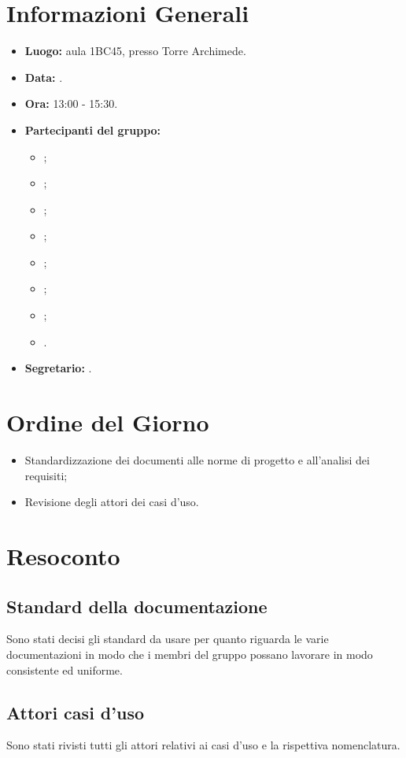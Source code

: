 \section{Informazioni Generali}
\begin{itemize}
\item \textbf{Luogo:} aula 1BC45, presso Torre Archimede.
\item \textbf{Data:} \Data.
\item \textbf{Ora:} 13:00 - 15:30.
\item \textbf{Partecipanti del gruppo:}
	\begin{itemize}
		\item \AT{}; 
		\item \BR{};
		\item \CE{}; 
		\item \DF{};
		\item \LD{};
		\item \MC{};
		\item \PF{};
		\item \SE{}.
	\end{itemize} 
\item \textbf{Segretario:} \BR{}.
\end{itemize}

\section{Ordine del Giorno}
\begin{itemize}
	\item Standardizzazione dei documenti alle norme di progetto e all'analisi dei requisiti;
	\item Revisione degli attori dei casi d'uso.
\end{itemize}


\section{Resoconto}
\subsection{Standard della documentazione}
Sono stati decisi gli standard da usare per quanto riguarda le varie documentazioni in modo che i membri del gruppo possano lavorare in modo consistente ed uniforme.\\

\subsection{Attori casi d'uso}
Sono stati rivisti tutti gli attori relativi ai casi d'uso e la rispettiva nomenclatura.\\

\clearpage